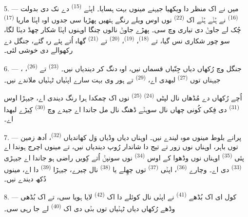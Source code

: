5. --- میں نے اک منظر دا  ویکھیا جیہنے مینوں بہت ہسایا۔ اپݨے
 \textsuperscript{(15)} دے نک دی بدولت 
\textsuperscript{(16)} نے ہُݨے ہُݨے اک  \textsuperscript{(22)} نوں
اوس ویلے رنگے ہتھیں پھڑیا سی جدوں اوہ اپݨا ماریا 
\textsuperscript{(17)} چُک لے جاوݨ دی تیاری وچ سی۔ پھڑے جاوݨ نالوں چنگا اوہنوں اپݨا
شکار چھڈ دیݨا لگا، سو چور شکاری نس گیا، تے  \textsuperscript{(18)}،
 \textsuperscript{(19)}،  \textsuperscript{(20)} تے
 \textsuperscript{(21)} گھاہ اُتے پئے رہ گئے، جنگل دے رکھوالے دی
خوشی لئی۔

6. --- جنگل وچ رُکھاں دیاں جِنّیاں قسماں نیں، اوہ دنگ کر دیندیاں نیں۔
 \textsuperscript{(23)} تے  \textsuperscript{(26)}،
، جیہناں توں  \textsuperscript{(27)} لبھدی اے،
 \textsuperscript{(29)} تے ہور وی بہت سارے اپݨیاں ٹہݨیاں ملاندے نیں۔

اُچے رُکھاں دے مُڈھاں نال لپٹی  \textsuperscript{(24)}
 \textsuperscript{(25)} نوں اک چمکدا ہرا رنگ دیندی اے، جیہڑا اوس
 \textsuperscript{(31)} دی فِکی کُونی چھاں نال سوہݨے ڈھنگ نال مل جاندا
اے جیدے وچ  \textsuperscript{(30)} کِیڑے لبھدا اے۔

\VUsaut{3.0mm}
\VUsaut{3.0mm}

7. --- پرانے بلوط مینوں موہ لیندے نیں۔ اوہناں دیاں وڈیاں وَل کھاندیاں
 \textsuperscript{(32)}، اَدھ زمین توں باہر، اوہناں نوں زور تے تیج دا
شاندار رُوپ دیندیاں نیں، تے مینوں اچرج ہوندا اے پئی 
\textsuperscript{(35)} اوہناں نوں وڈھوا کے اوس  \textsuperscript{(34)} نوں
سونپݨ اُتے کِویں راضی ہو جاندا اے جیہڑی  \textsuperscript{(33)} دی
اے۔ وچارے  \textsuperscript{(36)}، اپݨی 
\textsuperscript{(37)} توں چھِلے یا  \textsuperscript{(38)} نال چیرے،
جیہڑا  \textsuperscript{(39)} دا اے، مینوں دُکھ دیندے نیں۔

8. --- کول ای اک بُڈھے  \textsuperscript{(41)} نے اپݨی
 نال کوئلے دا اک  \textsuperscript{(42)} لایا ہویا سی، تے اک
بُڈھی وڈھے رُکھاں دیاں ٹہݨیاں توں بݨی  دی اک 
\textsuperscript{(40)} لے جا رہی سی۔

\VUsaut{3.0mm}
\VUsaut{3.0mm}

